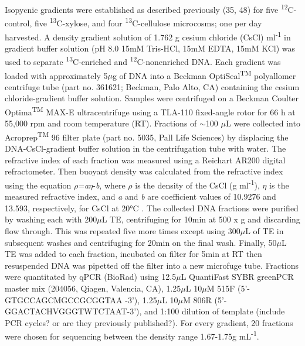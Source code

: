  Isopycnic gradients were established as described previously (35, 48) for five \textsuperscript{12}C-control, five \textsuperscript{13}C-xylose, and four \textsuperscript{13}C-cellulose microcosms; one per day harvested. A density gradient solution of 1.762 g cesium chloride (CsCl) ml\textsuperscript{-1} in gradient buffer solution (pH 8.0 15mM Tris-HCl, 15mM EDTA, 15mM KCl) was used to separate \textsuperscript{13}C-enriched and \textsuperscript{12}C-nonenriched DNA. Each gradient was loaded with approximately 5$\mu$g of DNA into a Beckman OptiSeal\textsuperscript{TM} polyallomer centrifuge tube (part no. 361621; Beckman, Palo Alto, CA) containing the cesium chloride-gradient buffer solution. Samples were centrifuged on a Beckman Coulter Optima\textsuperscript{TM} MAX-E ultracentrifuge using a TLA-110 fixed-angle rotor for 66 h at 55,000 rpm and room temperature (RT). Fractions of $\sim$100 $\mu$L were collected into Acroprep\textsuperscript{TM} 96 filter plate (part no. 5035, Pall Life Sciences) by displacing the DNA-CsCl-gradient buffer solution in the centrifugation tube with water. The refractive index of each fraction was measured using a Reichart AR200 digital refractometer. Then buoyant density was calculated from the refractive index using the equation $\rho$=\textit{a}$\eta$-\textit{b}, where $\rho$ is the density of the CsCl (g ml\textsuperscript{-1}), $\eta$ is the measured refractive index, and \textit{a} and \textit{b} are coefficient values of 10.9276 and 13.593, respectively, for CsCl at 20°C \cite{9780408708036}. The collected DNA fractions were purified by washing each with 200$\mu$L TE, centrifuging for 10min at 500 x g and discarding flow through. This was repeated five more times except using 300$\mu$L of TE in subsequent washes and centrifuging for 20min on the final wash. Finally, 50$\mu$L TE was added to each fraction, incubated on filter for 5min at RT then resuspended DNA was pipetted off the filter into a new microfuge tube.   Fractions were quantitated by qPCR (BioRad) using 12.5$\mu$L QuantiFast  SYBR greenPCR  master mix (204056, Qiagen, Valencia, CA), 1.25$\mu$L 10$\mu$M 515F (5'-GTGCCAGCMGCCGCGGTAA -3'), 1.25$\mu$L 10$\mu$M 806R (5'-GGACTACHVGGGTWTCTAAT-3'), and 1:100 dilution of template (include PCR cycles? or are they previously published?). For every gradient, 20 fractions were chosen for sequencing between the density range 1.67-1.75g mL\textsuperscript{-1}.      


